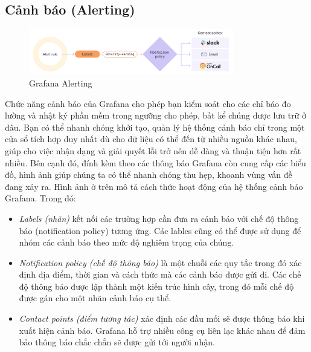 \subsection{Cảnh báo (Alerting)}
\begin{figure}[H] %
    \centering %
    \includegraphics[width=0.8\textwidth]{figures/Alerting.png} 
    \caption{Grafana Alerting} %
    \label{fig:fig_01}
\end{figure}
Chức năng cảnh báo của Grafana cho phép bạn kiểm soát cho các chỉ báo đo lường và nhật ký phần mềm trong ngưỡng cho phép, bất kể chúng được lưu trữ ở đâu. Bạn có thể nhanh chóng khởi tạo, quản lý hệ thống cảnh báo chỉ trong một cửa sổ tích hợp duy nhất dù cho dữ liệu có thể đến từ nhiều nguồn khác nhau, giúp cho việc nhận dạng và giải quyết lỗi trở nên dễ dàng và thuận tiện hơn rất nhiều. Bên cạnh đó, đính kèm theo các thông báo Grafana còn cung cấp các biểu đồ, hình ảnh giúp chúng ta có thể nhanh chóng thu hẹp, khoanh vùng vấn đề đang xảy ra. Hình ảnh ở trên mô tả cách thức hoạt động của hệ thống cảnh báo Grafana. Trong đó:
\begin{itemize}
    \item \textit{Labels (nhãn)} kết nối các trường hợp cần đưa ra cảnh báo với chế độ thông báo (notification policy) tương ứng. Các lables cũng có thể được sử dụng để nhóm các cảnh báo theo mức độ nghiêm trọng của chúng.
    \item \textit{Notification policy (chế độ thông báo)} là một chuỗi các quy tắc trong đó xác định địa điểm, thời gian và cách thức mà các cảnh báo được gửi đi. Các chế độ thông báo được lập thành một kiến trúc hình cây, trong đó mỗi chế độ được gán cho một nhãn cảnh báo cụ thể. 
    \item \textit{Contact points (điểm tương tác)} xác định các đầu mối sẽ được thông báo khi xuất hiện cảnh báo. Grafana hỗ trợ nhiều công cụ liên lạc khác nhau để đảm bảo thông báo chắc chắn sẽ được gửi tới người nhận.
\end{itemize}
